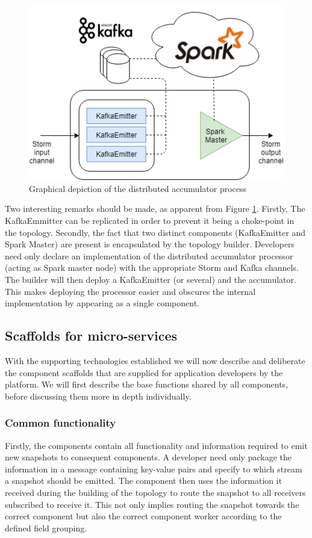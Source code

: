 \begin{figure}
\centering
\includegraphics[width=.7\textwidth]{resources/img/distributed_accumulator.png}
\caption{Graphical depiction of the distributed accumulator process}
\label{fig:distributed_accumulator}
\end{figure}

Two interesting remarks should be made, as apparent from Figure \ref{fig:distributed_accumulator}. Firstly, The KafkaEmmitter can be replicated in order to prevent it being a choke-point in the topology. Secondly, the fact that two distinct components (KafkaEmitter and Spark Master) are present is encapsulated by the topology builder. Developers need only declare an implementation of the distributed accumulator processor (acting as Spark master node) with the appropriate Storm and Kafka channels. The builder will then deploy a KafkaEmitter (or several) and the accumulator. This makes deploying the processor easier and obscures the internal implementation by appearing as a single component.

\subsection{Scaffolds for micro-services}
With the supporting technologies established we will now describe and deliberate the component scaffolds that are supplied for application developers by the platform. We will first describe the base functions shared by all components, before discussing them more in depth individually.

\subsubsection*{Common functionality}
Firstly, the components contain all functionality and information required to emit new snapshots to consequent components. A developer need only package the information in a message containing key-value pairs and specify to which stream a snapshot should be emitted. The component then uses the information it received during the building of the topology to route the snapshot to all receivers subscribed to receive it. This not only implies routing the snapshot towards the correct component but also the correct component worker according to the defined field grouping.

